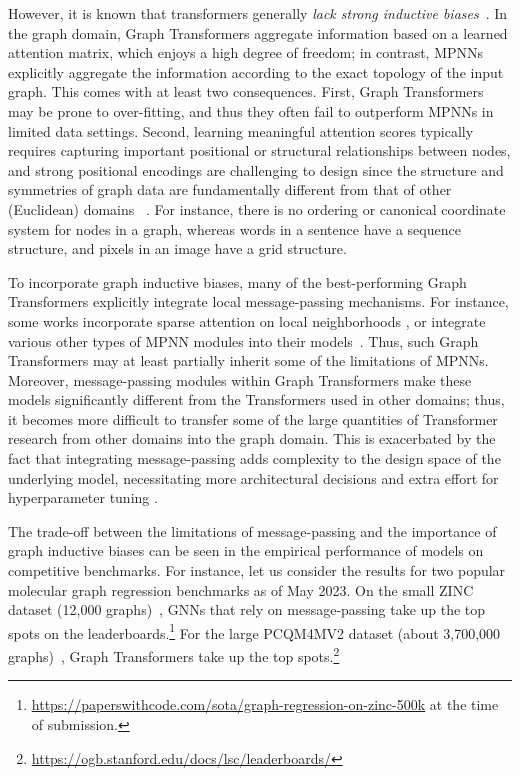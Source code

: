\documentclass[nohyperref, dvipsnames]{article}
\theoremstyle{plain}
\theoremstyle{definition}
\theoremstyle{remark}
\begin{document}
However, it is known that transformers generally \textit{lack strong inductive biases}~\cite{dosovitskiy2020ImageWorth16x16}.
In the graph domain, Graph Transformers aggregate information based on a learned attention matrix, which enjoys a high degree of freedom; in contrast, MPNNs explicitly aggregate the information according to the exact topology of the input graph.
This comes with at least two consequences.
First, Graph Transformers may be prone to over-fitting, and thus they often fail to outperform MPNNs in limited data settings.
Second, learning meaningful attention scores typically requires capturing important positional or structural relationships between nodes, 
and strong positional encodings are challenging to design since the structure and symmetries of graph data are fundamentally different from that of other (Euclidean) domains ~\cite{vaswani2017AttentionAllYou, bronstein2021GeometricDeepLearning}.
For instance, there is no ordering or canonical coordinate system for nodes in a graph, whereas words in a sentence have a sequence structure, and pixels in an image have a grid structure.

To incorporate graph inductive biases, many of the best-performing Graph Transformers explicitly integrate local message-passing mechanisms.
For instance, some works incorporate sparse attention on local neighborhoods \cite{dwivedi2021GeneralizationTransformerNetworks, kreuzer2021RethinkingGraphTransformers}, 
or integrate various other types of MPNN modules into their models~\cite{chen2022StructureAwareTransformerGraph, rampasek2022RecipeGeneralPowerful}.
Thus, such Graph Transformers may at least partially inherit some of the limitations of MPNNs.
Moreover, message-passing modules within Graph Transformers make these models significantly different from the Transformers used in other domains; thus, it becomes more difficult to transfer some of the large quantities of Transformer research from other domains into the graph domain.
This is exacerbated by the fact that integrating message-passing
adds complexity to the design space of the underlying model, necessitating more architectural decisions and extra effort for hyperparameter tuning \cite{masters2022GPSOptimisedHybrid}.


The trade-off between the limitations of message-passing and the importance of graph inductive biases can be seen in the empirical performance of models on competitive benchmarks. For instance, let us consider the results for two popular molecular graph regression benchmarks as of May 2023. On the small ZINC dataset (12,000 graphs)~\citep{dwivedi2020BenchmarkingGraphNeural}, GNNs that rely on message-passing take up the top spots on the leaderboards.\footnote{\url{https://paperswithcode.com/sota/graph-regression-on-zinc-500k} at the time of submission.} For the large PCQM4MV2 dataset (about 3,700,000 graphs)~\citep{hu2021ogblsc}, Graph Transformers take up the top spots.\footnote{\url{https://ogb.stanford.edu/docs/lsc/leaderboards/}}
\end{document}
